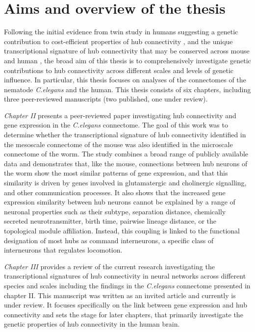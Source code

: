 \section{Aims and overview of the thesis}

Following the initial evidence from twin study in humans suggesting a genetic contribution to cost-efficient properties of hub connectivity \citep{Fornito2011}, and the unique transcriptional signature of hub connectivity that may be conserved across mouse and human \citep{Vertes2016b,Fulcher2016}, the broad aim of this thesis is to comprehensively investigate genetic contributions to hub connectivity across different scales and levels of genetic influence. In particular, this thesis focuses on analyses of the connectomes of the nematode \textit{C.elegans} and the human. This thesis consists of six chapters, including three peer-reviewed manuscripts (two published, one under review). 

\textit{Chapter II} presents a peer-reviewed paper investigating hub connectivity and gene expression in the \textit{C.elegans} connectome. The goal of this work was to determine whether the transcriptional signature of hub connectivity identified in the mesoscale connectome of the mouse \citep{Fulcher2016} was also identified in the microscale connectome of the worm. The study combines a broad range of publicly available data and demonstrates that, like the mouse, connections between hub neurons of the worm show the most similar patterns of gene expression, and that this similarity is driven by genes involved in glutamatergic and cholinergic signalling, and other communication processes. It also shows that the increased gene expression similarity between hub neurons cannot be explained by a range of neuronal properties such as their subtype, separation distance, chemically secreted neurotransmitter, birth time, pairwise lineage distance, or the topological module affiliation. Instead, this coupling is linked to the functional designation of most hubs as command interneurons, a specific class of interneurons that regulates locomotion. 

\textit{Chapter III} provides a review of the current research investigating the transcriptional signatures of hub connectivity in neural networks across different species and scales including the findings in the \textit{C.elegans} connectome presented in chapter II. This manuscript was written as an invited article and currently is under review. It focuses specifically on the link between gene expression and hub connectivity and sets the stage for later chapters, that primarily investigate the genetic properties of hub connectivity in the human brain.

